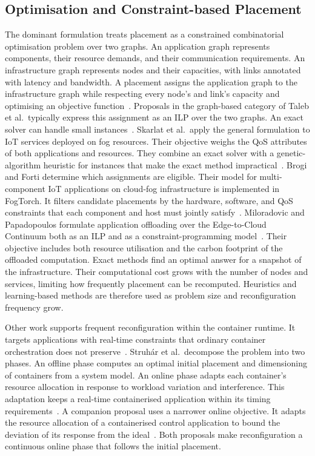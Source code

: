 \subsection{Optimisation and Constraint-based Placement}
\label{subsec:constraint-based-placement}

The dominant formulation treats placement as a constrained combinatorial optimisation problem over two graphs.
%
An application graph represents components, their resource demands, and their communication requirements.
An infrastructure graph represents nodes and their capacities,
with links annotated with latency and bandwidth.
%
A placement assigns the application graph to the infrastructure graph while respecting every node's and link's capacity and optimising an objective function~\cite{DBLP:journals/csur/Ait-SalahtDL20}.
%
Proposals in the graph-based category of Taleb et al.\ typically express this assignment as an \ac{ILP} over the two graphs.
An exact solver can handle small instances~\cite{DBLP:journals/csur/TalebGD25}.
%
Skarlat et al.\ apply the general formulation to \ac{IoT} services deployed on fog resources.
Their objective weighs the \ac{QoS} attributes of both applications and resources.
They combine an exact solver with a genetic-algorithm heuristic for instances that make the exact method impractical~\cite{DBLP:journals/soca/SkarlatNSBL17}.
%
Brogi and Forti determine which assignments are eligible.
Their model for multi-component \ac{IoT} applications on cloud-fog infrastructure is implemented in FogTorch.
It filters candidate placements by the hardware, software, and \ac{QoS} constraints that each component and host must jointly satisfy~\cite{DBLP:journals/iotj/BrogiF17}.
%
Miloradovic and Papadopoulos formulate application offloading over the Edge-to-Cloud Continuum both as an \ac{ILP} and as a constraint-programming model~\cite{DBLP:conf/cdc/MiloradovicP23}.
%
Their objective includes both resource utilisation and the carbon footprint of the offloaded computation.
%
Exact methods find an optimal answer for a snapshot of the infrastructure.
Their computational cost grows with the number of nodes and services, limiting how frequently placement can be recomputed.
%
Heuristics and learning-based methods are therefore used as problem size and reconfiguration frequency grow.

Other work supports frequent reconfiguration within the container runtime.
It targets applications with real-time constraints that ordinary container orchestration does not preserve~\cite{DBLP:conf/fogiot/StruharBAP20}.
%
Struhár et al.\ decompose the problem into two phases.
%
An offline phase computes an optimal initial placement and dimensioning of containers from a system model.
%
An online phase adapts each container's resource allocation in response to workload variation and interference.
This adaptation keeps a real-time containerised application within its timing requirements~\cite{DBLP:journals/tecs/StruharCABP24}.
%
A companion proposal uses a narrower online objective.
It adapts the resource allocation of a containerised control application to bound the deviation of its response from the ideal~\cite{DBLP:conf/etfa/StruharABPC23}.
%
Both proposals make reconfiguration a continuous online phase that follows the initial placement.

